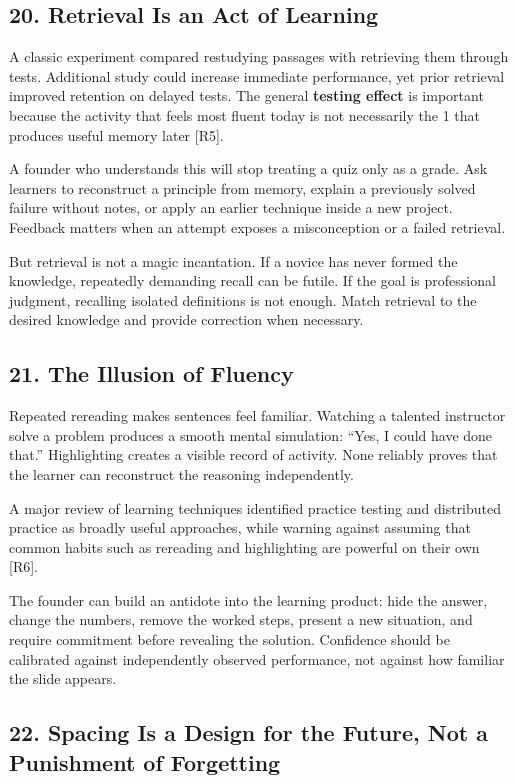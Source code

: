 \subsection*{20. Retrieval Is an Act of Learning}

A classic experiment compared restudying passages with retrieving them through tests. Additional study could increase immediate performance, yet prior retrieval improved retention on delayed tests. The general \textbf{testing effect} is important because the activity that feels most fluent today is not necessarily the 1 that produces useful memory later [R5].

A founder who understands this will stop treating a quiz only as a grade. Ask learners to reconstruct a principle from memory, explain a previously solved failure without notes, or apply an earlier technique inside a new project. Feedback matters when an attempt exposes a misconception or a failed retrieval.

But retrieval is not a magic incantation. If a novice has never formed the knowledge, repeatedly demanding recall can be futile. If the goal is professional judgment, recalling isolated definitions is not enough. Match retrieval to the desired knowledge and provide correction when necessary.

\subsection*{21. The Illusion of Fluency}

Repeated rereading makes sentences feel familiar. Watching a talented instructor solve a problem produces a smooth mental simulation: ``Yes, I could have done that.'' Highlighting creates a visible record of activity. None reliably proves that the learner can reconstruct the reasoning independently.

A major review of learning techniques identified practice testing and distributed practice as broadly useful approaches, while warning against assuming that common habits such as rereading and highlighting are powerful on their own [R6].

The founder can build an antidote into the learning product: hide the answer, change the numbers, remove the worked steps, present a new situation, and require commitment before revealing the solution. Confidence should be calibrated against independently observed performance, not against how familiar the slide appears.

\subsection*{22. Spacing Is a Design for the Future, Not a Punishment of Forgetting}


